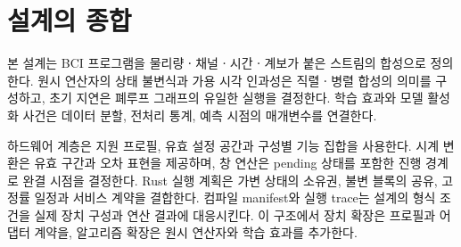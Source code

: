 \section{설계의 종합}
본 설계는 BCI 프로그램을 물리량ㆍ채널ㆍ시간ㆍ계보가 붙은 스트림의 합성으로 정의한다.
원시 연산자의 상태 불변식과 가용 시각 인과성은 직렬ㆍ병렬 합성의 의미를 구성하고,
초기 지연은 폐루프 그래프의 유일한 실행을 결정한다.
학습 효과와 모델 활성화 사건은 데이터 분할, 전처리 통계, 예측 시점의 매개변수를 연결한다.

하드웨어 계층은 지원 프로필, 유효 설정 공간과 구성별 기능 집합을 사용한다.
시계 변환은 유효 구간과 오차 표현을 제공하며, 창 연산은 pending 상태를 포함한
진행 경계로 완결 시점을 결정한다. Rust 실행 계획은 가변 상태의 소유권,
불변 블록의 공유, 고정률 일정과 서비스 계약을 결합한다.
컴파일 manifest와 실행 trace는 설계의 형식 조건을 실제 장치 구성과 연산 결과에 대응시킨다.
이 구조에서 장치 확장은 프로필과 어댑터 계약을, 알고리즘 확장은 원시 연산자와 학습 효과를 추가한다.
